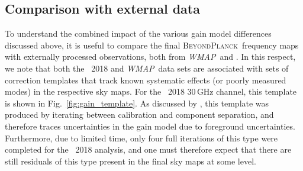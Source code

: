 \documentclass[twocolumn]{aa}
\def\WMAP{\textit{WMAP}}
\newcommand{\BP}{\textsc{BeyondPlanck}}
\begin{document}




\subsection{Comparison with external data}
\label{sec:external}

To understand the combined impact of the various gain model
differences discussed above, it is useful to compare the final
\BP\ frequency maps with externally processed observations, both from
\WMAP\ and \Planck. In this respect, we note that both the
\Planck\ 2018 and \WMAP\ data sets are associated with sets of
correction templates that track known systematic effects (or poorly
measured modes) in the respective sky maps. For the \Planck\ 2018
30\,GHz channel, this template is shown in
Fig.~\ref{fig:gain_template}. As discussed by \citet{planck2016-l02},
this template was produced by iterating between calibration and
component separation, and therefore traces uncertainties in the gain
model due to foreground uncertainties. Furthermore, due to limited
time, only four full iterations of this type were completed for the
\Planck\ 2018 analysis, and one must therefore expect that there are
still residuals of this type present in the final sky maps at some
level.
\end{document}
